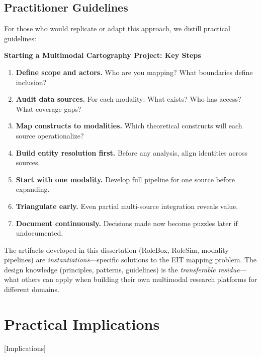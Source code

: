 \documentclass[../main.tex]{subfiles}
\begin{document}
\subsection{Practitioner Guidelines}

For those who would replicate or adapt this approach, we distill practical guidelines:

\begin{importantbox}
\textbf{Starting a Multimodal Cartography Project: Key Steps}
\begin{enumerate}[leftmargin=*, itemsep=0.2em]
\item \textbf{Define scope and actors.} Who are you mapping? What boundaries define inclusion?
\item \textbf{Audit data sources.} For each modality: What exists? Who has access? What coverage gaps?
\item \textbf{Map constructs to modalities.} Which theoretical constructs will each source operationalize?
\item \textbf{Build entity resolution first.} Before any analysis, align identities across sources.
\item \textbf{Start with one modality.} Develop full pipeline for one source before expanding.
\item \textbf{Triangulate early.} Even partial multi-source integration reveals value.
\item \textbf{Document continuously.} Decisions made now become puzzles later if undocumented.
\end{enumerate}
\end{importantbox}

\begin{insightbox}
The artifacts developed in this dissertation (RoleBox, RoleSim, modality pipelines) are \emph{instantiations}---specific solutions to the EIT mapping problem. The design knowledge (principles, patterns, guidelines) is the \emph{transferable residue}---what others can apply when building their own multimodal research platforms for different domains.
\end{insightbox}


\section{Practical Implications}[Implications]
\end{document}
